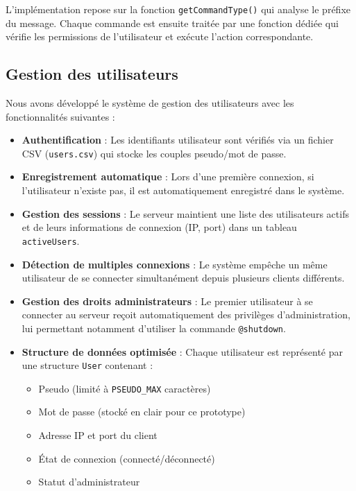 \documentclass{cs-moi}
\begin{document}
  L'implémentation repose sur la fonction \texttt{getCommandType()} qui analyse le préfixe du message. Chaque commande est ensuite traitée par une fonction dédiée qui vérifie les permissions de l'utilisateur et exécute l'action correspondante.

  \subsection{Gestion des utilisateurs}
  
  Nous avons développé le système de gestion des utilisateurs avec les fonctionnalités suivantes :
  
  \begin{itemize}
    \item \textbf{Authentification} : Les identifiants utilisateur sont vérifiés via un fichier CSV (\texttt{users.csv}) qui stocke les couples pseudo/mot de passe.
  
    \item \textbf{Enregistrement automatique} : Lors d'une première connexion, si l'utilisateur n'existe pas, il est automatiquement enregistré dans le système.
  
    \item \textbf{Gestion des sessions} : Le serveur maintient une liste des utilisateurs actifs et de leurs informations de connexion (IP, port) dans un tableau \texttt{activeUsers}.
  
    \item \textbf{Détection de multiples connexions} : Le système empêche un même utilisateur de se connecter simultanément depuis plusieurs clients différents.
  
    \item \textbf{Gestion des droits administrateurs} : Le premier utilisateur à se connecter au serveur reçoit automatiquement des privilèges d'administration, lui permettant notamment d'utiliser la commande \texttt{@shutdown}.
  
    \item \textbf{Structure de données optimisée} : Chaque utilisateur est représenté par une structure \texttt{User} contenant :
    \begin{itemize}
      \item Pseudo (limité à \texttt{PSEUDO\_MAX} caractères)
      \item Mot de passe (stocké en clair pour ce prototype)
      \item Adresse IP et port du client
      \item État de connexion (connecté/déconnecté)
      \item Statut d'administrateur
    \end{itemize}
  \end{itemize}
\end{document}
